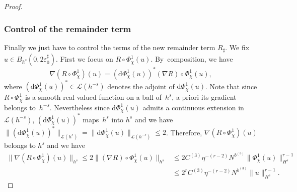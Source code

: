 \begin{proof}
\subsubsection*{Control of the remainder term}
Finally we just have to control the terms of the new remainder term $R_\sharp$. We fix $u\in B_{h^s}(0,2 \varepsilon_0^\sharp)$. First we focus on $R \circ \Phi_\chi^1(u)$. By~composition, we have
\[
\nabla (R \circ \Phi_\chi^1)(u) = (\mathrm{d}\Phi_\chi^1(u))^* (\nabla R) \circ \Phi_\chi^1(u),
\]
where $ (\mathrm{d}\Phi_\chi^1(u))^* \in \mathscr{L}(h^{-s})$ denotes the adjoint of $\mathrm{d}\Phi_\chi^1(u)$. Note that since $R \circ \Phi_\chi^1$ is a smooth real valued function on a ball of~$h^s$, a priori its gradient belongs to~$h^{-s}$. Nevertheless since $\mathrm{d}\Phi_\chi^1(u)$ admits a continuous extension in $\mathscr{L}(h^{-s})$, $(\mathrm{d}\Phi_\chi^1(u))^*$ maps~$h^s$ into $h^s$ and we have $\|(\mathrm{d}\Phi_\chi^1(u))^* \|_{\mathscr{L}(h^{s})} = \|\mathrm{d}\Phi_\chi^1(u) \|_{\mathscr{L}(h^{-s})} \leq 2$. Therefore, \hbox{$\nabla (R \circ \Phi_\chi^1)(u)$} belongs to $h^s$ and we have
\begin{equation*}
\begin{split}
\| \nabla (R \circ \Phi_\chi^1)(u) \|_{h^s} \leq 2 \| (\nabla R) \circ \Phi_\chi^1(u) \|_{h^s} &\leq 2 C^{(3)} \eta^{-(r-2)} N^{b^{(3)}} \|\Phi_\chi^1(u) \|_{H^s}^{r-1} \\
&\leq 2^r C^{(3)} \eta^{-(r-2)} N^{b^{(3)}} \| u \|_{H^s}^{r-1}.
\end{split}
\end{equation*}


\end{proof}
